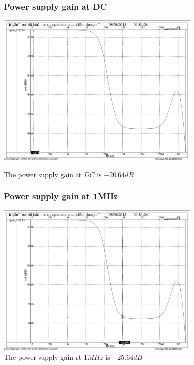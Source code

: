 \documentclass[]{article}
\begin{document}
		\begin{figure}
			\subsubsection{ Power supply gain at DC}
			\includegraphics[width=0.89\textwidth]{PSRR_DC_FINAL.pdf}
			\caption{The power supply gain at $DC$ is $-20.64dB$}
			\subsubsection{Power supply gain at 1MHz}
			\includegraphics[width=0.89\textwidth]{PSRR_high_FINAL.pdf}
			\caption{The power supply gain at $1MHz$ is $-25.64dB$}
		\end{figure}
		
\end{document}
